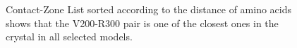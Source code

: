\documentclass[twocolumn]{bmcart}%
\def\CoZoList{Contact-Zone List\xspace}
\begin{document}
\begin{figure}[t!]
    \vspace{-5pt}
    \caption{\CoZoList sorted according to the distance of amino acids shows that the V200-R300 pair is one of the closest ones in the crystal in all selected models.}
  \label{fig:list_pocket_string}
\end{figure}
\end{document}
